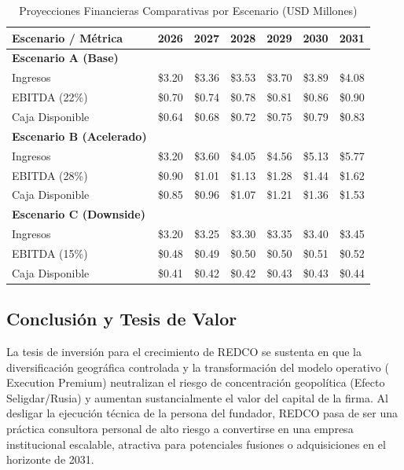 \begin{table}[htbp]
\centering
\caption{Proyecciones Financieras Comparativas por Escenario (USD Millones)}
\begin{tabular}{@{}lrrrrrr@{}}
\toprule
\textbf{Escenario / Métrica} & \textbf{2026} & \textbf{2027} & \textbf{2028} & \textbf{2029} & \textbf{2030} & \textbf{2031} \\
\midrule
\textbf{Escenario A (Base)} & & & & & & \\
Ingresos & \$3.20 & \$3.36 & \$3.53 & \$3.70 & \$3.89 & \$4.08 \\
\rowcolor{tablealt} EBITDA (22\%) & \$0.70 & \$0.74 & \$0.78 & \$0.81 & \$0.86 & \$0.90 \\
Caja Disponible & \$0.64 & \$0.68 & \$0.72 & \$0.75 & \$0.79 & \$0.83 \\
\midrule
\textbf{Escenario B (Acelerado)} & & & & & & \\
Ingresos & \$3.20 & \$3.60 & \$4.05 & \$4.56 & \$5.13 & \$5.77 \\
\rowcolor{tablealt} EBITDA (28\%) & \$0.90 & \$1.01 & \$1.13 & \$1.28 & \$1.44 & \$1.62 \\
Caja Disponible & \$0.85 & \$0.96 & \$1.07 & \$1.21 & \$1.36 & \$1.53 \\
\midrule
\textbf{Escenario C (Downside)} & & & & & & \\
Ingresos & \$3.20 & \$3.25 & \$3.30 & \$3.35 & \$3.40 & \$3.45 \\
\rowcolor{tablealt} EBITDA (15\%) & \$0.48 & \$0.49 & \$0.50 & \$0.50 & \$0.51 & \$0.52 \\
Caja Disponible & \$0.41 & \$0.42 & \$0.42 & \$0.43 & \$0.43 & \$0.44 \\
\bottomrule
\end{tabular}
\label{tab:financial_projections}
\end{table}

\subsection{Conclusión y Tesis de Valor}

La tesis de inversión para el crecimiento de REDCO se sustenta en que la diversificación geográfica controlada y la transformación del modelo operativo ( Execution Premium) neutralizan el riesgo de concentración geopolítica (Efecto Seligdar/Rusia) y aumentan sustancialmente el valor del capital de la firma. Al desligar la ejecución técnica de la persona del fundador, REDCO pasa de ser una práctica consultora personal de alto riesgo a convertirse en una empresa institucional escalable, atractiva para potenciales fusiones o adquisiciones en el horizonte de 2031.
